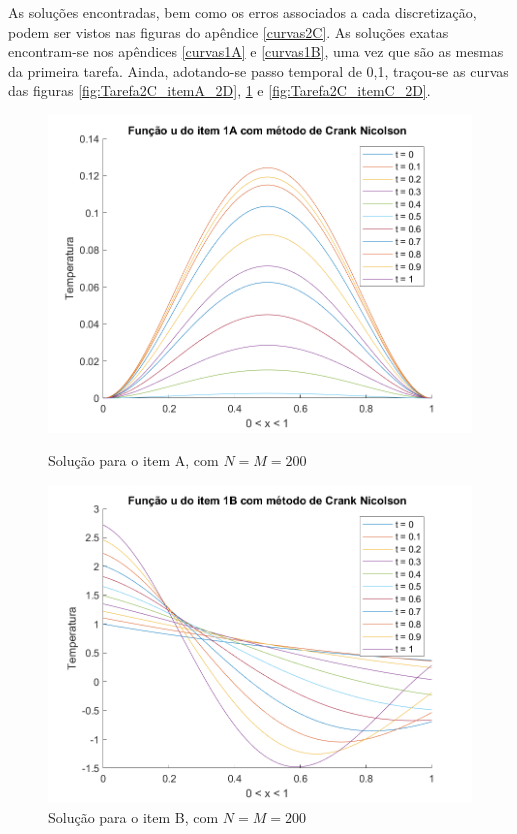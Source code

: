\documentclass[12pt]{article}
\begin{document}
\begin{spacing}{1.5}
\vspace{1cm}
As soluções encontradas, bem como os erros associados a cada discretização, podem ser vistos nas figuras do apêndice \ref{curvas2C}. As soluções exatas encontram-se nos apêndices \ref{curvas1A} e \ref{curvas1B}, uma vez que são as mesmas da primeira tarefa. Ainda, adotando-se passo temporal de 0,1, traçou-se as curvas das figuras \ref{fig:Tarefa2C_itemA_2D}, \ref{fig:Tarefa2C_itemB_2D} e \ref{fig:Tarefa2C_itemC_2D}. 

\clearpage
\begin{figure}[ht!]
\centering
    \begin{minipage}[b]{0.45\linewidth}
    \includegraphics[width=1\linewidth]{Segunda_Tarefa/ItemC/itemA_2D.png}
    \caption{Solução para o item A, com $N=M=200$}
    \label{fig:Tarefa2C_itemA_2D}
\end{minipage}
\quad
\begin{minipage}[b]{0.45\linewidth}
    \includegraphics[width=1\linewidth]{Segunda_Tarefa/ItemC/itemB_2D.png}
    \caption{Solução para o item B, com $N=M=200$}
    \label{fig:Tarefa2C_itemB_2D}
\end{minipage}
\end{figure}


\end{spacing}
\end{document}
